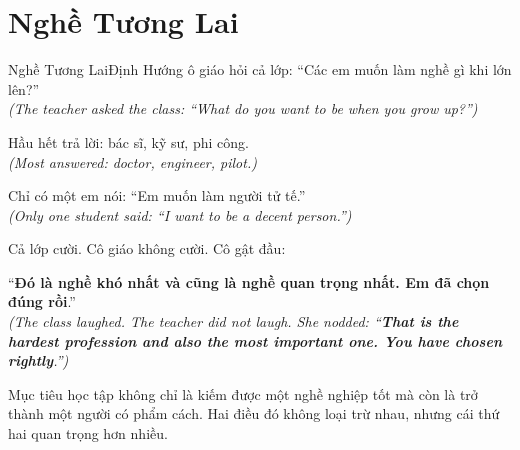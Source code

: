 \section{Nghề Tương Lai}
\begin{truyen}{Nghề Tương Lai}{Định Hướng}
ô giáo hỏi cả lớp: ``Các em muốn làm nghề gì khi lớn lên?''\\
\textit{(The teacher asked the class: ``What do you want to be when you grow up?'')}

Hầu hết trả lời: bác sĩ, kỹ sư, phi công.\\
\textit{(Most answered: doctor, engineer, pilot.)}

Chỉ có một em nói: ``Em muốn làm người tử tế.''\\
\textit{(Only one student said: ``I want to be a decent person.'')}

Cả lớp cười. Cô giáo không cười. Cô gật đầu:

``\textbf{Đó là nghề khó nhất và cũng là nghề quan trọng nhất. Em đã chọn đúng rồi}.''\\
\textit{(The class laughed. The teacher did not laugh. She nodded: ``\textbf{That is the hardest profession and also the most important one. You have chosen rightly}.'')}
\end{truyen}
\begin{baihoc}
  Mục tiêu học tập không chỉ là kiếm được một nghề nghiệp tốt mà còn là trở thành một người có phẩm cách. Hai điều đó không loại trừ nhau, nhưng cái thứ hai quan trọng hơn nhiều.
\end{baihoc}


